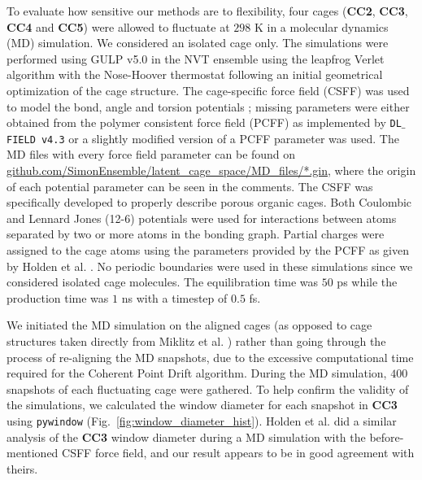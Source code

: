 \documentclass[journal=jacsat,manuscript=article]{achemso}
\begin{document}
{\color{red}To evaluate how sensitive our methods are to flexibility, four cages (\textbf{CC2}, \textbf{CC3}, \textbf{CC4} and \textbf{CC5}) were allowed to fluctuate at $298$ K in a molecular dynamics (MD) simulation. We considered an isolated cage only. The simulations were performed using GULP v5.0 \cite{gale1997gulp} in the NVT ensemble using the leapfrog Verlet algorithm with the Nose-Hoover thermostat following an initial geometrical optimization of the cage structure. The cage-specific force field (CSFF) was used to model the bond, angle and torsion potentials \cite{holden2012bespoke}; missing parameters were either obtained from the polymer consistent force field (PCFF) \cite{sun1994ab,sun1994force,sun1995ab} as implemented by \texttt{DL$\_$FIELD v4.3} \cite{yong2016dlfield} or a slightly modified version of a PCFF parameter was used. The MD files with every force field parameter can be found on \url{github.com/SimonEnsemble/latent_cage_space/MD_files/*.gin}, where the origin of each potential parameter can be seen in the comments. The CSFF was specifically developed to properly describe porous organic cages. Both Coulombic and Lennard Jones (12-6) potentials were used for interactions between atoms separated by two or more atoms in the bonding graph. Partial charges were assigned to the cage atoms using the parameters provided by the PCFF as given by Holden et al. \cite{holden2012bespoke}. No periodic boundaries were used in these simulations since we considered isolated cage molecules. The equilibration time was $50$ ps while the production time was $1$ ns with a timestep of $0.5$ fs.

We initiated the MD simulation on the aligned cages (as opposed to cage structures taken directly from Miklitz et al. \cite{miklitz2017computational}) rather than going through the process of re-aligning the MD snapshots, due to the excessive computational time required for the Coherent Point Drift algorithm. During the MD simulation, $400$ snapshots of each fluctuating cage were gathered. To help confirm the validity of the simulations, we calculated the window diameter for each snapshot in \textbf{CC3} using \texttt{pywindow} (Fig.~\ref{fig:window_diameter_hist}). Holden et al.\cite{holden2012bespoke} did a similar analysis of the \textbf{CC3} window diameter during a MD simulation with the before-mentioned CSFF force field, and our result appears to be in good agreement with theirs.

}
\end{document}
